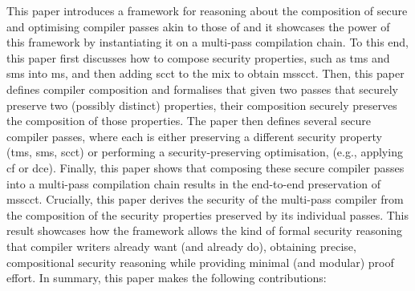 \documentclass[dvipsnames,conference]{IEEEtran}
\theoremstyle{definition}
\begin{document}
This paper introduces a framework for reasoning about the composition of secure and optimising compiler passes akin to those of  and it showcases the power of this framework by instantiating it on a multi-pass compilation chain.
To this end, this paper first discusses how to compose security properties, such as \gls*{tms} and \gls*{sms} into \gls*{ms}, and then adding \gls*{scct} to the mix to obtain \gls*{msscct}.
Then, this paper defines compiler composition and formalises that given two passes that securely preserve two (possibly distinct) properties, their composition securely preserves the composition of those properties.
The paper then defines several secure compiler passes, where each is either preserving a different security property (\gls*{tms}, \gls*{sms}, \gls*{scct}) or performing a security-preserving optimisation, (e.g., applying \gls*{cf} or \gls*{dce}).
Finally, this paper shows that composing these secure compiler passes into a multi-pass compilation chain results in the end-to-end preservation of \gls*{msscct}.
Crucially, this paper derives the security of the multi-pass compiler from the composition of the security properties preserved by its individual passes.
This result showcases how the framework allows the kind of formal security reasoning that compiler writers already want (and already do), obtaining precise, compositional security reasoning while providing minimal (and modular) proof effort.
%
In summary, this paper makes the following contributions:
\end{document}
